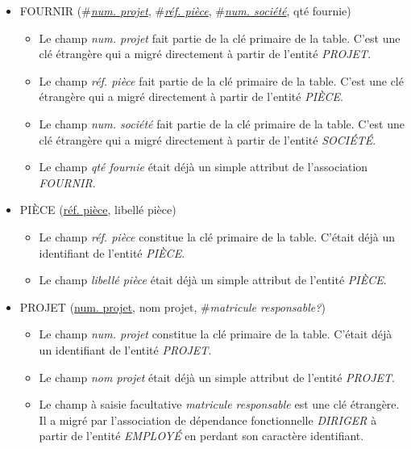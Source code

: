 \documentclass[a4paper]{article}
\newcommand{\relat}[1]{\textsc{#1}}
\newcommand{\attr}[1]{#1}
\newcommand{\prim}[1]{\uline{#1}}
\newcommand{\foreign}[1]{\#\textsl{#1}}
\begin{document}
\begin{itemize}
  \item \relat{FOURNIR} (\foreign{\prim{num. projet}}, \foreign{\prim{réf. pièce}}, \foreign{\prim{num. société}}, \attr{qté fournie})
  \begin{itemize}
    \item Le champ \emph{num. projet} fait partie de la clé primaire de la table. C'est une clé étrangère qui a migré directement à partir de l'entité \emph{PROJET}.
    \item Le champ \emph{réf. pièce} fait partie de la clé primaire de la table. C'est une clé étrangère qui a migré directement à partir de l'entité \emph{PIÈCE}.
    \item Le champ \emph{num. société} fait partie de la clé primaire de la table. C'est une clé étrangère qui a migré directement à partir de l'entité \emph{SOCIÉTÉ}.
    \item Le champ \emph{qté fournie} était déjà un simple attribut de l'association \emph{FOURNIR}.
  \end{itemize}

  \item \relat{PIÈCE} (\prim{réf. pièce}, \attr{libellé pièce})
  \begin{itemize}
    \item Le champ \emph{réf. pièce} constitue la clé primaire de la table. C'était déjà un identifiant de l'entité \emph{PIÈCE}.
    \item Le champ \emph{libellé pièce} était déjà un simple attribut de l'entité \emph{PIÈCE}.
  \end{itemize}

  \item \relat{PROJET} (\prim{num. projet}, \attr{nom projet}, \foreign{matricule responsable?})
  \begin{itemize}
    \item Le champ \emph{num. projet} constitue la clé primaire de la table. C'était déjà un identifiant de l'entité \emph{PROJET}.
    \item Le champ \emph{nom projet} était déjà un simple attribut de l'entité \emph{PROJET}.
    \item Le champ à saisie facultative \emph{matricule responsable} est une clé étrangère. Il a migré par l'association de dépendance fonctionnelle \emph{DIRIGER} à partir de l'entité \emph{EMPLOYÉ} en perdant son caractère identifiant.
  \end{itemize}


\end{itemize}
\end{document}
